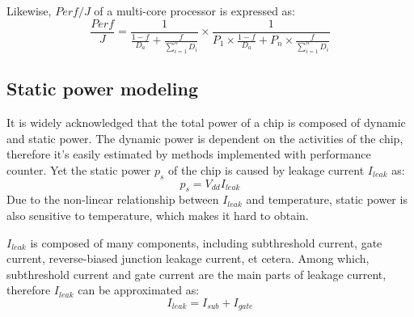 Likewise, $Perf/J$ of a multi-core processor is expressed as:
\begin{equation}\label{ppw}
\frac{Perf}{J} =\frac{1} {\frac{1-f}{D_{a}}+\frac{f}{\sum_{i=1}^{n}D_{i}}} \times \frac{1}{P_{1} \times \frac{1-f}{D_{a}}+P_{n} \times \frac{f}{\sum_{i=1}^{n}D_{i}}}
\end{equation}



\subsection{Static power modeling}

It is widely acknowledged that the total power of a chip is composed of dynamic and static power. The dynamic power is dependent on the activities of the chip, therefore it's easily estimated by methods implemented with performance counter. Yet the static power $p_{s}$ of the chip is caused by leakage current $I_{leak}$ as:
\begin{equation}\label{eq:sta_power}
p_{s} = V_{dd}I_{leak}
\end{equation}
Due to the non-linear relationship between $I_{leak}$ and temperature, static power is also sensitive to temperature, which makes it hard to obtain. 

$I_{leak}$ is composed of many components, including subthreshold current, gate current, reverse-biased junction leakage current, et cetera. Among which, subthreshold current and gate current are the main parts of leakage current, therefore $I_{leak}$ can be approximated as:
\begin{equation}\label{eq:leakage}
I_{leak}=I_{sub}+I_{gate}
\end{equation}

